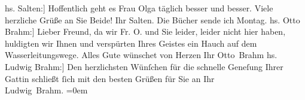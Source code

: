\begin{ledgroupsized}[t]{13cm}
           \pstart
           \noindent{}{[}hs. Salten:{]} Hoffentlich geht es Frau Olga täglich besser und besser. Viele herzliche Grüße an Sie
               Beide!\pend
           \pstart Ihr \spacefill\mbox{Salten.}\pend{}\pstart
           \noindent{}Die Bücher sende ich Montag.\pend
           \pstart
           \noindent{}{[}hs. Otto Brahm:{]} Lieber Freund, da wir Fr. O.
               und Sie leider, leider nicht hier haben, huldigten wir Ihnen und verspürten Ihres
               Geistes ein Hauch auf dem Wasserleitungswege. Alles Gute wünschet von Herzen\pend
           \pstart Ihr \spacefill\mbox{Otto Brahm}\pend{}\pstart
           \noindent{}{[}hs. Ludwig Brahm:{]} Den herzlichsten Wünſchen für die schnelle Geneſung
               Ihrer Gattin schließt ſich mit den besten
               Grüßen für Sie an\pend
           \pstart
           Ihr{\\[\baselineskip]}\spacefill\mbox{Ludwig Brahm.}\pend
           \leftskip=0em{}
         
         \endnumbering{}\end{ledgroupsized}  \newcommand{\dateiname}{L02578}\newcommand{\titel}{Felix Salten, Jakob Wassermann, Otto Brahm, Ludwig Brahm an Arthur Schnitzler, 21. 07. [1907?]}\newcommand{\editorInnen}{Martin Anton Müller}
      